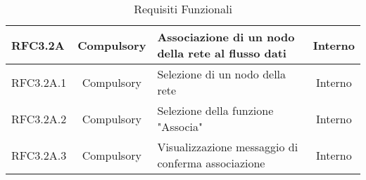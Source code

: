\begin{table}[!htpb]
\begin{tabular}{|l|c|p{8cm}|c|}
                \hline
                RFC3.2A & Compulsory & Associazione di un nodo della rete al flusso dati & Interno\\
                \hline
                RFC3.2A.1 & Compulsory & Selezione di un nodo della rete & Interno\\
                \hline
                RFC3.2A.2 & Compulsory & Selezione della funzione "Associa" & Interno\\
                \hline
                RFC3.2A.3 & Compulsory & Visualizzazione messaggio di conferma associazione & Interno\\
                \hline
                
			\end{tabular}
			\caption{Requisiti Funzionali}
		\end{table}
		

